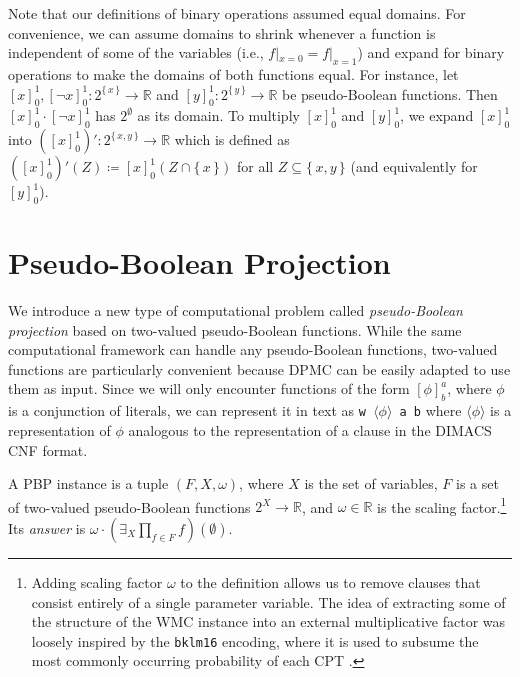 \begin{remark}
  Note that our definitions of binary operations assumed equal domains. For
  convenience, we can assume domains to shrink whenever a function is
  independent of some of the variables (i.e., $f|_{x=0} = f|_{x=1}$) and expand
  for binary operations to make the domains of both functions equal. For
  instance, let ${[x]}_0^1,{[\neg x]}_0^1\colon 2^{\{\, x \,\}} \to \mathbb{R}$
  and ${[y]}_0^1\colon 2^{\{\, y \,\}} \to \mathbb{R}$ be pseudo-Boolean
  functions. Then ${[x]}_0^1 \cdot {[\neg x]}_0^1$ has $2^\emptyset$ as its
  domain. To multiply ${[x]}_0^1$ and ${[y]}_0^1$, we expand ${[x]}_0^1$ into
  $\left({[x]}_0^1\right)'\colon 2^{\{\, x, y \,\}} \to \mathbb{R}$ which is
  defined as
  $\left({[x]}_0^1\right)'(Z) \coloneqq {[x]}_0^1(Z \cap \{\, x \,\})$ for all
  $Z \subseteq \{\, x, y \,\}$ (and equivalently for ${[y]}_0^1$).
\end{remark}

\section{Pseudo-Boolean Projection}

We introduce a new type of computational problem called \emph{pseudo-Boolean
  projection} based on two-valued pseudo-Boolean functions. While the same
computational framework can handle any pseudo-Boolean functions, two-valued
functions are particularly convenient because \textsc{DPMC} can be easily
adapted to use them as input. Since we will only encounter functions of the form
${[\phi]}^a_b$, where $\phi$ is a conjunction of literals, we can represent it
in text as \texttt{w $\langle\phi\rangle$ a b} where $\langle\phi\rangle$ is a
representation of $\phi$ analogous to the representation of a clause in the
DIMACS CNF format.

\begin{definition}\label{def:pbp}
  A PBP instance is a tuple $(F, X, \omega)$, where $X$ is the set of variables,
  $F$ is a set of two-valued pseudo-Boolean functions $2^X \to \mathbb{R}$, and
  $\omega \in \mathbb{R}$ is the scaling factor.\footnote{ Adding scaling factor
    $\omega$ to the definition allows us to remove clauses that consist entirely
    of a single parameter variable. The idea of extracting some of the structure
    of the WMC instance into an external multiplicative factor was loosely
    inspired by the \texttt{bklm16} encoding, where it is used to subsume the
    most commonly occurring probability of each CPT
    \citep{DBLP:conf/ecai/BartKLM16}.} Its \emph{answer} is
  $\omega \cdot \left(\exists_X\prod_{f \in F}f\right)(\emptyset)$.
\end{definition}

